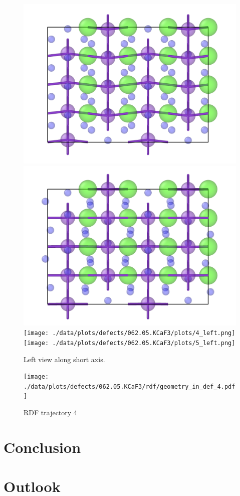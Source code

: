 \documentclass[nobib,a4paper,twoside,notoc,justified,marginals=justified]{tufte-book}
\begin{document}
\begin{figure}
	\includegraphics[width=.5\textwidth]{./data/plots/defects/062.05.KCaF3/plots/ref_left.png} \hfill
	\includegraphics[width=.5\textwidth]{./data/plots/defects/062.05.KCaF3/plots/2_left.png} \\
	\texttt{[image: ./data/plots/defects/062.05.KCaF3/plots/4\_left.png]} \hfill
	\texttt{[image: ./data/plots/defects/062.05.KCaF3/plots/5\_left.png]}
	\caption{Left view along short axis.}
	\label{}
\end{figure}

\begin{figure}
	\texttt{[image: ./data/plots/defects/062.05.KCaF3/rdf/geometry\_in\_def\_4.pdf]}
	\caption{RDF trajectory 4}
	\label{}
\end{figure}

\chapter{Conclusion}

\chapter{Outlook}

\cleardoublepage
{}
{}





\end{document}
